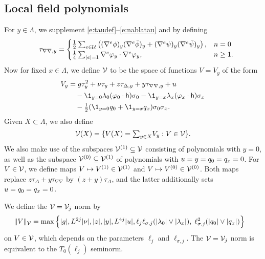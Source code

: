 \subsection{Local field polynomials}

For $y \in \Lambda$, we supplement \eqref{e:taudef}--\eqref{e:nablatau} and 
by defining
\begin{equation}
\label{e:tauphi2}
\quad \tau_{\nabla\nabla,y}
	=
\begin{cases}
\frac 12 \sum_{e \in \mathcal{U}}
\left(
	(\nabla^e \phi)_y (\nabla^e \bar\phi)_y +
	(\nabla^e \psi)_y (\nabla^e \bar\psi)_y
\right),
	& n = 0 \\
\frac{1}{4} \sum_{|e| = 1} \nabla^e \varphi_y \cdot \nabla^e \varphi_y,
	& n \ge 1.
\end{cases}
\end{equation}
Now for fixed $x \in \Lambda$,
we define $\mathcal{V}$ to be the space of functions $V=V_y$ of the form 
\begin{align}
\lbeq{Vy}
V_y
	&=
g \tau_y^2 + \nu \tau_y + z \tau_{\Delta,y} + y \tau_{\nabla\nabla,y} + u
	\nnb&\quad
- \1_{y=\pp}\lambda_{\pp}(\varphi_{\pp} \cdot {\sf h})\sigma_\pp
- \1_{y=\qq}\lambda_{\qq}(\varphi_{\qq} \cdot {\sf h})\sigma_\qq
	\nnb&\quad
- \textstyle{\frac 12} (\1_{y=\pp} q_\pp + \1_{y=\qq}q_\qq )\sigma_\pp\sigma_\qq.
\end{align}
Given $X \subset \Lambda$, we also define
\begin{equation}
\label{e:Vcalesig}
\mathcal{V}(X) = \{V(X) = \textstyle{\sum_{y\in X}} V_y : V \in \mathcal{V} \}.
\end{equation}
We also make use of the subspaces $\mathcal{V}^{(1)} \subseteq \mathcal{V}$ consisting of polynomials with $y = 0$, as well as the subspace
$\mathcal{V}^{(0)} \subseteq \mathcal{V}^{(1)}$ of polynomials with
$u = y =   q_0=q_x = 0$.
For $V \in \mathcal{V}$, we define maps $V \mapsto V^{(1)} \in \mathcal{V}^{(1)}$
and $V \mapsto V^{(0)} \in \mathcal{V}^{(0)}$. Both maps replace
$z\tau_{\Delta}+y\tau_{\nabla\nabla}$ by
$(z+y)\tau_{\Delta}$, and the latter
additionally sets
$u = q_0 = q_x = 0$.

We define the $\mathcal{V} = \mathcal{V}_j$ norm by
\begin{equation}
\label{e:Vnormdef}
\begin{aligned}
\|V\|_{\mathcal{V}} &=
\max\Big\{
|g|, L^{2j}|\nu|, |z|, |y|,  L^{4j}|u|,
\ell_j\ell_{\sigma,j}(|\lambda_0|\vee|\lambda_x|),\;
 \ell_{\sigma,j}^{2} (|q_0|\vee|q_x|)
\Big\}
\end{aligned}
\end{equation}
on $V \in \mathcal{V}$, which depends on the parameters $\ell_j$ and $\ell_{\sigma,j}$.
The $\mathcal{V} = \mathcal{V}_j$ norm is equivalent to the $T_0(\ell_j)$ seminorm.

